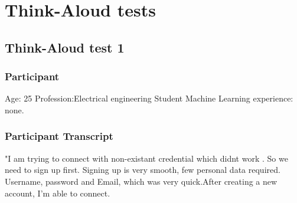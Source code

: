 \section{Think-Aloud tests}
\subsection{Think-Aloud test 1}
\subsubsection{Participant}
Age: 25
\newline
Profession:Electrical engineering Student
\newline
Machine Learning experience: none.
\newline

\subsubsection{Participant Transcript}
"I am trying to connect with non-existant credential which didnt work . So we need to sign up first. Signing up is very smooth, few personal data required. Username, password and Email, which was very quick.After creating a new account, I'm able to connect. 
